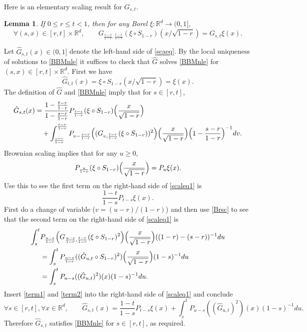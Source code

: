 \documentclass[12pt]{article}
\makeatletter
\renewenvironment{proof}[1][\proofname]{%
\par\pushQED{\qed}\normalfont%
\topsep6\p@\@plus6\p@\relax
\trivlist\item[\hskip\labelsep\bfseries#1\@addpunct{.}]%
\ignorespaces
}{%
\popQED\endtrivlist\@endpefalse
}
\numberwithin{theorem}{section}
\newtheorem{lemma}[theorem]{Lemma}
\theoremstyle{def}
\numberwithin{equation}{section}
\newcommand{\R}{\mathbb{R}}
\makeatother
\begin{document}
Here is an elementary scaling result for $G_{s,t}$.

\begin{lemma}\label{lem:scaling}
If $0\le r\le t<1$, then for any Borel $\xi:\R^d\to(0,1]$, 
\begin{equation}\label{scaeq}
\forall (s,x)\in[r,t]\times\R^d, \qquad G_{\frac{s-r}{1-r},\frac{t-r}{1-r}}(\xi\circ S_{1-r})(x/\sqrt{1-r})=G_{s,t}\xi(x).
\end{equation}
\end{lemma}
\begin{proof} Let $\hat G_{s,t}(x)\in(0,1]$ denote the left-hand side of \eqref{scaeq}.  By the local uniqueness of solutions to \eqref{BBMnle} it suffices to check that $\hat G$ solves \eqref{BBMnle} for $(s,x)\in[r,t]\times\R^d$.  
First we have
\[\hat G_{t,t}(x)=\xi\circ S_{1-r}(x/\sqrt{1-r})=\xi(x).\]
The definition of $\hat G$ and \eqref{BBMnle} imply that for $s\in[r,t]$,
\begin{align}\label{scaleq1}
\hat G_{s,t}(x)&=\frac{1-\frac{t-r}{1-r}}{1-\frac{s-r}{1-r}}P_{\frac{t-s}{1-r}}(\xi\circ S_{1-r})\Bigl(\frac{x}{\sqrt{1-r}}\Bigr)\\
\nonumber&\quad+\int_{\frac{s-r}{1-r}}^{\frac{t-r}{1-r}}P_{v-\frac{s-r}{1-r}}\Bigl((G_{v,\frac{t-r}{1-r}}(\xi\circ S_{1-r}))^2\Bigr)\Bigl(\frac{x}{\sqrt{1-r}}\Bigr)\Bigl(1-\frac{s-r}{1-r}\Bigr)^{-1}dv.
\end{align}
Brownian scaling implies that for any $u\ge 0$,
\begin{equation}\label{Brsc}
P_{\frac{u}{1-r}}(\xi\circ S_{1-r})\Bigl(\frac{x}{\sqrt{1-r}}\Bigr)=P_u\xi(x).
\end{equation}
Use this to see the first term on the right-hand side of \eqref{scaleq1} is
\begin{equation}\label{term1}\frac{1-t}{1-s}P_{t-s}\xi(x).
\end{equation}
First do a change of variable ($v=(u-r)/(1-r)$) and then use \eqref{Brsc}
to see that the second term on the right-hand side of \eqref{scaleq1} is
\begin{align}\label{term2}
\nonumber \int_s^t&P_{\frac{u-s}{1-r}}\Bigl(G_{\frac{u-s}{1-r},\frac{t-r}{1-r}}(\xi\circ S_{1-r})^2\Bigr)\Bigl(\frac{x}{\sqrt{1-r}}\Bigr)((1-r)-(s-r))^{-1}du\\
\nonumber&=\int_s^t P_{\frac{u-s}{1-r}}((\hat G_{u,t}\circ S_{1-r})^2)\Bigl(\frac{x}{\sqrt{1-r}}\Bigr)(1-s)^{-1}du\\
&=\int_s^t P_{u-s}((\hat G_{u,t})^2)(x)(1-s)^{-1}du.
\end{align}
Insert \eqref{term1} and \eqref{term2} into the right-hand side of \eqref{scaleq1} and conclude
\[
\forall s\in[r,t], \forall x\in\R^d,
\qquad\hat G_{s,t}(x)=\frac{1-t}{1-s}P_{t-s}\xi(x)+\int_s^t P_{u-s}((\hat G_{u,t})^2)(x)(1-s)^{-1}du. 
\]
Therefore $\hat G_{s,t}$ satisfies \eqref{BBMnle} for $s\in[r,t]$, as required.
\end{proof}
\end{document}
